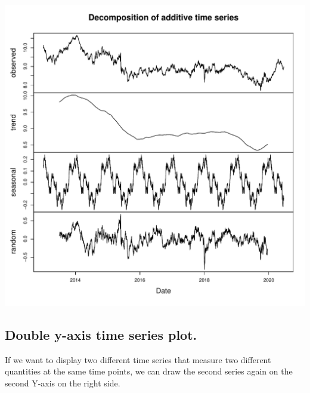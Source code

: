 \documentclass{article}\usepackage[]{graphicx}\usepackage[]{xcolor}
\makeatletter
\def\maxwidth{ %
  \ifdim\Gin@nat@width>\linewidth
    \linewidth
  \else
    \Gin@nat@width
  \fi
}
\newenvironment{knitrout}{}{} %
\makeatother
\begin{document}
\begin{knitrout}
\color{fgcolor}
\includegraphics[width=\maxwidth]{figure/unnamed-chunk-3-1} 
\end{knitrout}



\subsection{Double y-axis time series plot.}

If we want to display two different time series that measure two different quantities at the same time points, we can draw the second series again on the second Y-axis on the right side.
\end{document}
